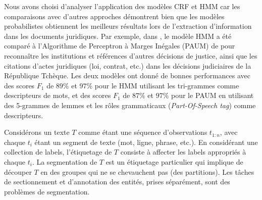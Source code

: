 Nous avons choisi d'analyser l'application des modèles CRF et HMM car les  comparaisons avec d'autres approches démontrent bien que les modèles probabilistes obtiennent les meilleurs résultats lors de l'extraction d'information dans les documents juridiques. Par exemple, dans \citet{Kriz2014nerinczechdecisions}, le modèle HMM a été comparé à l'Algorithme de Perceptron à Marges Inégales (PAUM) de \citet{li2002PAUM} pour reconnaître les institutions et références d'autres décisions de justice, ainsi que les citations d'actes juridiques (loi, contrat, etc.) dans les décisions judiciaires de la République Tchèque. Les deux modèles ont donné de bonnes performances avec des scores $F_1$ de $ 89 \% $ et $ 97 \% $ pour le HMM utilisant les tri-grammes comme descripteurs de mots, et des scores $F_1$ de $ 87 \% $ et $ 97 \% $ pour le PAUM en utilisant des 5-grammes de lemmes et les rôles grammaticaux (\textit{Part-Of-Speech tag}) comme descripteurs. 

Considérons un texte $T$ comme étant une séquence d'observations $t_{1:n}$, avec chaque $t_i$ étant un segment de texte (mot, ligne, phrase, etc.). En considérant une collection de labels, l'étiquetage de $T$ consiste à affecter les labels appropriés à chaque $t_i$. La segmentation de $T$ est un étiquetage particulier qui implique de découper $T$ en des groupes qui ne se chevauchent pas (des partitions). Les tâches de sectionnement et d'annotation des entités, prises séparément, sont des problèmes de segmentation.

